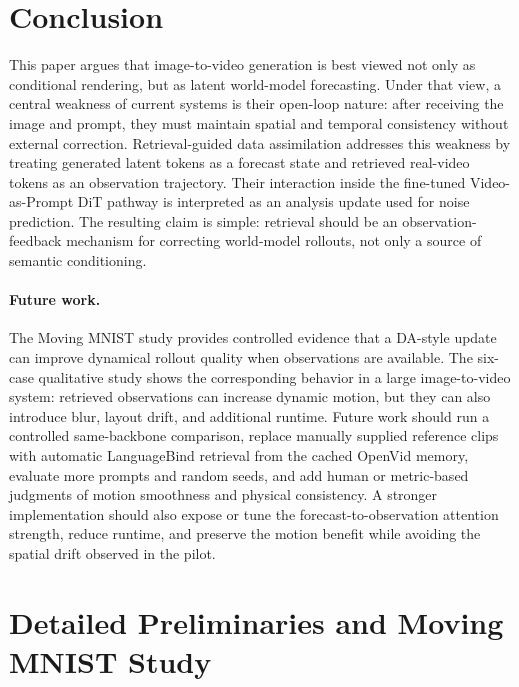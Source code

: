 \documentclass{article}
\begin{document}
\section{Conclusion}

This paper argues that image-to-video generation is best viewed not only as conditional rendering, but as latent world-model forecasting. Under that view, a central weakness of current systems is their open-loop nature: after receiving the image and prompt, they must maintain spatial and temporal consistency without external correction. Retrieval-guided data assimilation addresses this weakness by treating generated latent tokens as a forecast state and retrieved real-video tokens as an observation trajectory. Their interaction inside the fine-tuned Video-as-Prompt DiT pathway is interpreted as an analysis update used for noise prediction. The resulting claim is simple: retrieval should be an observation-feedback mechanism for correcting world-model rollouts, not only a source of semantic conditioning.

\paragraph{Future work.}
The Moving MNIST study provides controlled evidence that a DA-style update can improve dynamical rollout quality when observations are available. The six-case qualitative study shows the corresponding behavior in a large image-to-video system: retrieved observations can increase dynamic motion, but they can also introduce blur, layout drift, and additional runtime. Future work should run a controlled same-backbone comparison, replace manually supplied reference clips with automatic LanguageBind retrieval from the cached OpenVid memory, evaluate more prompts and random seeds, and add human or metric-based judgments of motion smoothness and physical consistency. A stronger implementation should also expose or tune the forecast-to-observation attention strength, reduce runtime, and preserve the motion benefit while avoiding the spatial drift observed in the pilot.

\clearpage



\clearpage
\appendix

\section{Detailed Preliminaries and Moving MNIST Study}
\label{app:prelim}
\end{document}
